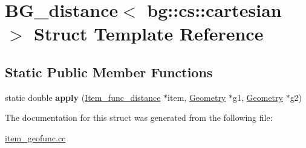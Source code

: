 \hypertarget{structBG__distance_3_01bg_1_1cs_1_1cartesian_01_4}{}\section{B\+G\+\_\+distance$<$ bg\+:\+:cs\+:\+:cartesian $>$ Struct Template Reference}
\label{structBG__distance_3_01bg_1_1cs_1_1cartesian_01_4}
\subsection*{Static Public Member Functions}
\begin{DoxyCompactItemize}
\item 
\mbox{\label{structBG__distance_3_01bg_1_1cs_1_1cartesian_01_4_a2334c0fc2760f659d204204729694cf0}} 
static double {\bfseries apply} (\mbox{\hyperlink{classItem__func__distance}{Item\+\_\+func\+\_\+distance}} $\ast$item, \mbox{\hyperlink{classGeometry}{Geometry}} $\ast$g1, \mbox{\hyperlink{classGeometry}{Geometry}} $\ast$g2)
\end{DoxyCompactItemize}


The documentation for this struct was generated from the following file\+:\begin{DoxyCompactItemize}
\item 
\mbox{\hyperlink{item__geofunc_8cc}{item\+\_\+geofunc.\+cc}}\end{DoxyCompactItemize}
